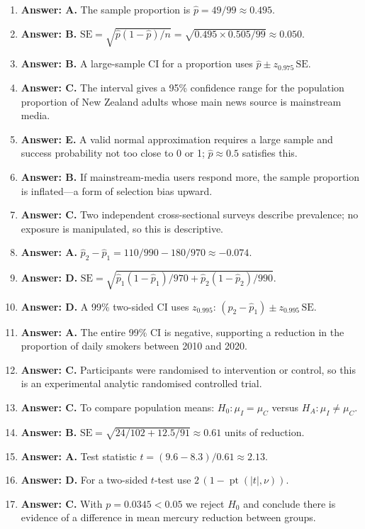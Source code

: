 \documentclass[11pt]{article}
\begin{document}
\begin{enumerate}[label=\textbf{Q\arabic*:}, leftmargin=*, itemsep=0.9em]
\item \textbf{Answer: A.} The sample proportion is $\hat{p} = 49/99 \approx 0.495$.
\item \textbf{Answer: B.} $\text{SE} = \sqrt{\hat{p}(1-\hat{p})/n} = \sqrt{0.495\times 0.505/99} \approx 0.050$.
\item \textbf{Answer: B.} A large-sample CI for a proportion uses $\hat{p} \pm z_{0.975}\,\text{SE}$.
\item \textbf{Answer: C.} The interval gives a 95\% confidence range for the population proportion of New Zealand adults whose main news source is mainstream media.
\item \textbf{Answer: E.} A valid normal approximation requires a large sample and success probability not too close to 0 or 1; $\hat{p}\approx 0.5$ satisfies this.
\item \textbf{Answer: B.} If mainstream-media users respond more, the sample proportion is inflated—a form of selection bias upward.
\item \textbf{Answer: C.} Two independent cross-sectional surveys describe prevalence; no exposure is manipulated, so this is descriptive.
\item \textbf{Answer: A.} $\hat{p}_2 - \hat{p}_1 = 110/990 - 180/970 \approx -0.074$.
\item \textbf{Answer: D.} $\text{SE} = \sqrt{\hat{p}_1(1-\hat{p}_1)/970 + \hat{p}_2(1-\hat{p}_2)/990}$.
\item \textbf{Answer: D.} A 99\% two-sided CI uses $z_{0.995}$: $(\hat{p}_2 - \hat{p}_1) \pm z_{0.995}\,\text{SE}$.
\item \textbf{Answer: A.} The entire 99\% CI is negative, supporting a reduction in the proportion of daily smokers between 2010 and 2020.
\item \textbf{Answer: C.} Participants were randomised to intervention or control, so this is an experimental analytic randomised controlled trial.
\item \textbf{Answer: C.} To compare population means: $H_0\!:\mu_I = \mu_C$ versus $H_A\!:\mu_I \ne \mu_C$.
\item \textbf{Answer: B.} $\text{SE} = \sqrt{24/102 + 12.5/91} \approx 0.61$ units of reduction.
\item \textbf{Answer: A.} Test statistic $t = (9.6 - 8.3)/0.61 \approx 2.13$.
\item \textbf{Answer: D.} For a two-sided $t$-test use $2\,(1 - \operatorname{pt}(|t|,\nu))$.
\item \textbf{Answer: C.} With $p=0.0345 < 0.05$ we reject $H_0$ and conclude there is evidence of a difference in mean mercury reduction between groups.

\end{enumerate}
\end{document}
